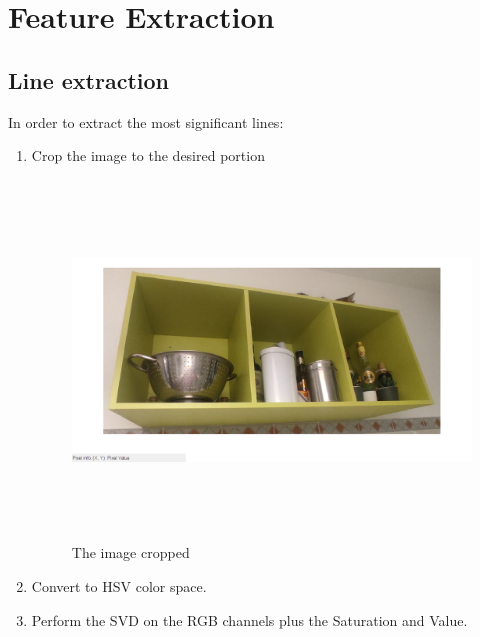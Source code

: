 \chapter{Feature Extraction}
\label{ch:Feature Extraction}

\section{Line extraction}
In order to extract the most significant lines:
\begin{enumerate}
    \item Crop the image to the desired portion
    \begin{figure}[H]
    \centering
    \includegraphics[height=9.5cm, width=\textwidth, keepaspectratio]{Report/Images/Features/Lines/CroppedImage.png}
    \caption{\label{fig:lines:cropped}The image cropped}
    \end{figure}

    \item Convert to HSV color space.

    \item Perform the SVD on the RGB channels plus the Saturation and Value.


\end{enumerate}
